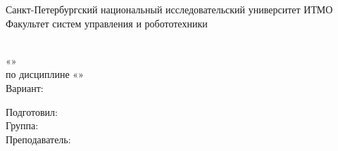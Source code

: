 \begin{titlepage}
\begin{center}
    Санкт-Петербургский национальный исследовательский университет ИТМО\\
        Факультет систем управления и робототехники
        \vskip 7cm
        
        \Huge \workType   \\
        \Large {«\workName »}  \\
        \Large {по дисциплине «\subjectName»} \\
        \Large {Вариант: \variantNum}
        \vskip 5cm
    \end{center}


    \begin{flushright}
        Подготовил:  \authorName      \\
        Группа: \groupNumber           \\
        Преподаватель:   \teacherName \\
    \end{flushright}
    \vskip 5cm


\begin{center}
    \placeNyear
\end{center}
\end{titlepage}